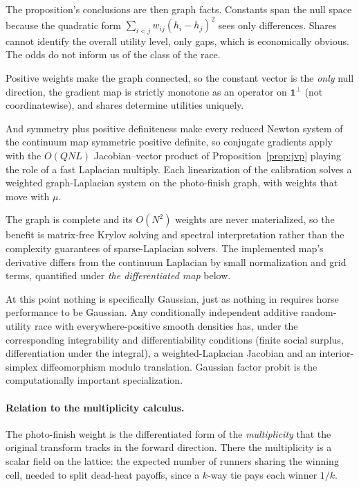 \documentclass[12pt]{article}
\theoremstyle{remark}
\begin{document}
The proposition's conclusions are then
graph facts. Constants span the null space because the quadratic form
$\sum_{i<j} w_{ij}(h_i - h_j)^2$ sees only differences. Shares cannot
identify the overall utility level, only gaps, which is economically
obvious. The odds do not inform us of the class of the race.

Positive weights make the graph
connected, so the constant vector is the \emph{only} null direction, the
gradient map is strictly monotone as an operator on $\mathbf{1}^\perp$
(not coordinatewise), and shares determine utilities uniquely.

And symmetry plus positive definiteness make every reduced Newton
system of the continuum map symmetric positive definite, so conjugate
gradients apply with the $O(QNL)$ Jacobian--vector product of
Proposition~\ref{prop:jvp} playing the role of a fast Laplacian
multiply. Each linearization of the calibration solves a weighted
graph-Laplacian system on the photo-finish graph, with weights that move
with $\mu$.

The graph is complete and its $O(N^2)$ weights are never
materialized, so the benefit is matrix-free Krylov solving and spectral
interpretation rather than the complexity guarantees of sparse-Laplacian
solvers. The implemented map's derivative differs from the continuum
Laplacian by small normalization and grid terms, quantified under
\emph{the differentiated map} below.

At this point nothing is specifically Gaussian, just as nothing in
\citet{cotton2021} requires horse performance to be Gaussian. Any conditionally independent additive random-utility race with
everywhere-positive smooth densities has, under the corresponding
integrability and differentiability conditions (finite social surplus,
differentiation under the integral), a weighted-Laplacian Jacobian and an
interior-simplex diffeomorphism modulo translation. Gaussian factor
probit is the computationally important specialization.

\paragraph{Relation to the multiplicity calculus.} The photo-finish weight
is the differentiated form of the \emph{multiplicity} that the original
transform \citep{cotton2021} tracks in the forward direction. There the
multiplicity is a scalar field on the lattice: the expected number of
runners sharing the winning cell, needed to split dead-heat payoffs,
since a $k$-way tie pays each winner $1/k$.
\end{document}
